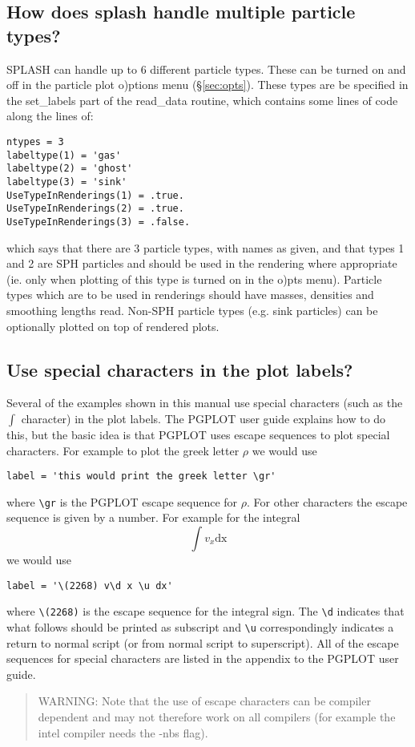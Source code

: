 \documentclass[a4paper,11pt]{article}
\begin{document}
\subsection{How does splash handle multiple particle types?}
SPLASH can handle up to 6 different particle types. These can be turned on and off in the particle plot
o)ptions menu (\S\ref{sec:opts}). These types are be specified in the set\_labels part of the read\_data
routine, which contains some lines of code along the lines of:
\begin{verbatim}
ntypes = 3
labeltype(1) = 'gas'
labeltype(2) = 'ghost'
labeltype(3) = 'sink'
UseTypeInRenderings(1) = .true.
UseTypeInRenderings(2) = .true.
UseTypeInRenderings(3) = .false.
\end{verbatim}
which says that there are 3 particle types, with names as given, and that types 1 and 2 are SPH particles and
should be used in the rendering where appropriate (ie. only when plotting of this type is turned on in the
o)pts menu). Particle types which are to be used in renderings should have masses, densities and smoothing
lengths read. Non-SPH particle types (e.g. sink particles) can be optionally plotted on top of rendered plots.

\subsection{Use special characters in the plot labels?}
 Several of the examples shown in this manual use special characters (such as
the $\int$ character) in the plot labels. The PGPLOT user guide explains how to do
this, but the basic idea is that PGPLOT uses escape sequences to plot special
characters. For example to plot the greek letter $\rho$ we would use
\begin{verbatim}
label = 'this would print the greek letter \gr'
\end{verbatim}
where \verb+\gr+ is the PGPLOT escape sequence for $\rho$. For other
characters the escape sequence is given by a number. For example for the integral 
\begin{equation}
\int v_x \mathrm{dx}
\end{equation}
we would use
\begin{verbatim}
label = '\(2268) v\d x \u dx'
\end{verbatim}
where \verb+\(2268)+ is the escape sequence for the integral sign. The
\verb+\d+ indicates that what follows should be printed as subscript and
\verb+\u+ correspondingly indicates a return to normal script (or from normal script to
superscript). All of the escape sequences for special characters are listed in
the appendix to the PGPLOT user guide.
\begin{quote}
 WARNING: Note that the use of escape characters can be compiler dependent and
 may not therefore work on all compilers (for example the intel compiler needs
 the -nbs flag).
\end{quote}
\end{document}

